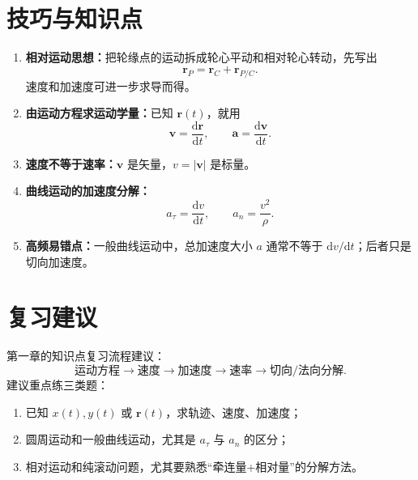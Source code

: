 \documentclass[11pt,a4paper]{ctexart}
\newcommand{\dd}{\mathrm{d}}
\begin{document}
\section*{技巧与知识点}

\begin{tipBox}
\begin{enumerate}
  \item \textbf{相对运动思想：}把轮缘点的运动拆成轮心平动和相对轮心转动，先写出
  \[
    \bm r_P=\bm r_C+\bm r_{P/C}.
  \]
  速度和加速度可进一步求导而得。
  \item \textbf{由运动方程求运动学量：}已知 $\bm r(t)$，就用
  \[
    \bm v=\frac{\dd\bm r}{\dd t},\qquad
    \bm a=\frac{\dd\bm v}{\dd t}.
  \]
  \item \textbf{速度不等于速率：}$\bm v$ 是矢量，$v=|\bm v|$ 是标量。
  \item \textbf{曲线运动的加速度分解：}
  \[
    a_\tau=\frac{\dd v}{\dd t},
    \qquad
    a_n=\frac{v^2}{\rho}.
  \]
  \item \textbf{高频易错点：}一般曲线运动中，总加速度大小 $a$ 通常不等于 $\dd v/\dd t$；后者只是切向加速度。
\end{enumerate}
\end{tipBox}

\section*{复习建议}

第一章的知识点复习流程建议：
\[
  \text{运动方程}
  \longrightarrow
  \text{速度}
  \longrightarrow
  \text{加速度}
  \longrightarrow
  \text{速率}
  \longrightarrow
  \text{切向/法向分解}.
\]
建议重点练三类题：
\begin{enumerate}
  \item 已知 $x(t),y(t)$ 或 $\bm r(t)$，求轨迹、速度、加速度；
  \item 圆周运动和一般曲线运动，尤其是 $a_\tau$ 与 $a_n$ 的区分；
  \item 相对运动和纯滚动问题，尤其要熟悉“牵连量+相对量”的分解方法。
\end{enumerate}
\end{document}
